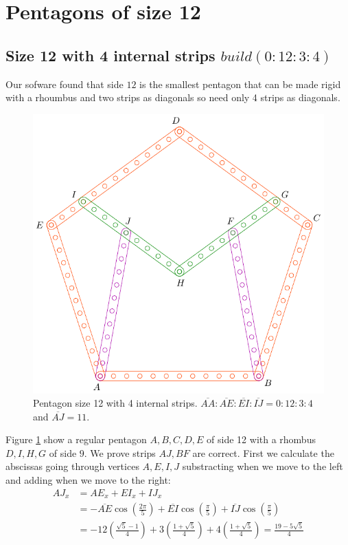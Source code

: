 \documentclass[11pt]{article}
\begin{document}

\section{Pentagons of size 12}

\subsection{Size 12 with 4 internal strips $build(0:12:3:4)$}

Our sofware found that side $12$ is the smallest pentagon that can be made rigid with a rhoumbus and two strips as diagonals so need only 4 strips as diagonals.

\begin{figure}[h]
 \centering
 \includegraphics[scale=0.8]{12/penta12a}
 \caption{Pentagon size 12 with 4 internal strips. $\overline{AA}:\overline{AE}:\overline{EI}:\overline{IJ} = 0:12:3:4$ and $\overline{AJ}=11$.}
 \label{fig:penta12a}
\end{figure}

Figure \ref{fig:penta12a} show a regular pentagon $A,B,C,D,E$ of side 12 with a rhombus $D,I,H,G$ of side $9$. We prove strips $AJ,BF$ are correct. First we calculate the abscissas going through vertices $A,E,I,J$ substracting when we move to the left and adding when we move to the right:
\begin{align}
AJ_x &= AE_x + EI_x + IJ_x\nonumber\\
 &= -\overline{AE}\cos\left(\frac{2\pi}5\right)
 + \overline{EI}\cos\left(\frac{\pi}5\right) 
 + \overline{IJ}\cos\left(\frac{\pi}5\right)\nonumber\\
 &= -12\left(\frac{\sqrt5 - 1}4\right)
  +3\left(\frac{1+\sqrt5}4\right)
  +4\left(\frac{1+\sqrt5}4\right) 
  = \frac{19-5\sqrt5}4
\end{align}
\end{document}
